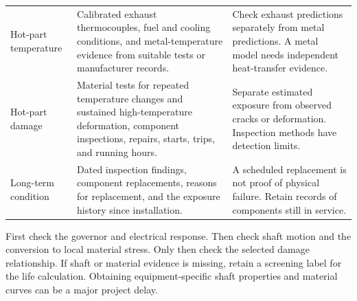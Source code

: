 \documentclass[11pt,a4paper]{report}
\begin{document}
\begin{longtable}{L{0.18\textwidth}L{0.35\textwidth}L{0.35\textwidth}}
Hot-part temperature & Calibrated exhaust thermocouples, fuel and cooling conditions, and metal-temperature evidence from suitable tests or manufacturer records. & Check exhaust predictions separately from metal predictions. A metal model needs independent heat-transfer evidence. \\
Hot-part damage & Material tests for repeated temperature changes and sustained high-temperature deformation, component inspections, repairs, starts, trips, and running hours. & Separate estimated exposure from observed cracks or deformation. Inspection methods have detection limits. \\
Long-term condition & Dated inspection findings, component replacements, reasons for replacement, and the exposure history since installation. & A scheduled replacement is not proof of physical failure. Retain records of components still in service. \\
\bottomrule
\end{longtable}

First check the governor and electrical response.
Then check shaft motion and the conversion to local material stress.
Only then check the selected damage relationship.
If shaft or material evidence is missing, retain a screening label for the life calculation.
Obtaining equipment-specific shaft properties and material curves can be a major project delay.
\end{document}
